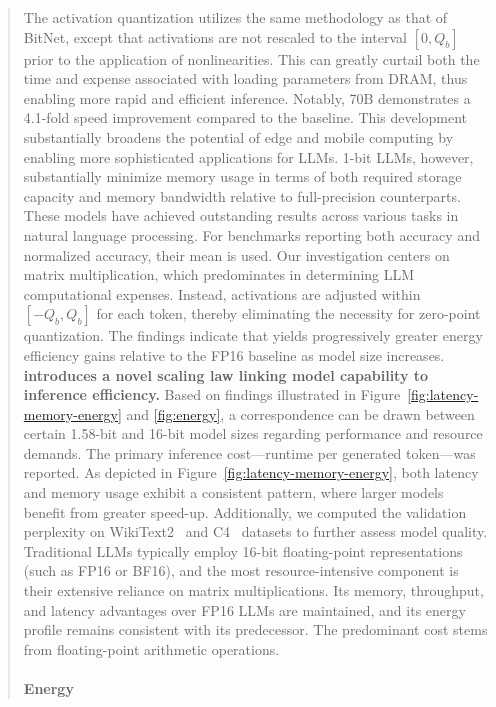 \begin{abstract}
The activation quantization utilizes the same methodology as that of BitNet, except that activations are not rescaled to the interval $[0, Q_b]$ prior to the application of nonlinearities. This can greatly curtail both the time and expense associated with loading parameters from DRAM, thus enabling more rapid and efficient inference. Notably,  70B demonstrates a 4.1-fold speed improvement compared to the  baseline. This development substantially broadens the potential of edge and mobile computing by enabling more sophisticated applications for LLMs. 1-bit LLMs, however, substantially minimize memory usage in terms of both required storage capacity and memory bandwidth relative to full-precision counterparts. These models have achieved outstanding results across various tasks in natural language processing. For benchmarks reporting both accuracy and normalized accuracy, their mean is used. Our investigation centers on matrix multiplication, which predominates in determining LLM computational expenses. Instead, activations are adjusted within $[-Q_b, Q_b]$ for each token, thereby eliminating the necessity for zero-point quantization. The findings indicate that  yields progressively greater energy efficiency gains relative to the FP16  baseline as model size increases. \textbf{ introduces a novel scaling law linking model capability to inference efficiency.} Based on findings illustrated in Figure~\ref{fig:latency-memory-energy} and \ref{fig:energy}, a correspondence can be drawn between certain 1.58-bit and 16-bit model sizes regarding performance and resource demands. The primary inference cost—runtime per generated token—was reported. As depicted in Figure~\ref{fig:latency-memory-energy}, both latency and memory usage exhibit a consistent pattern, where larger models benefit from greater speed-up. Additionally, we computed the validation perplexity on WikiText2~\cite{wikitext2} and C4~\cite{c4} datasets to further assess model quality. Traditional LLMs typically employ 16-bit floating-point representations (such as FP16 or BF16), and the most resource-intensive component is their extensive reliance on matrix multiplications. Its memory, throughput, and latency advantages over FP16 LLMs are maintained, and its energy profile remains consistent with its predecessor. The predominant cost stems from floating-point arithmetic operations. \paragraph{Energy}


\end{abstract}
